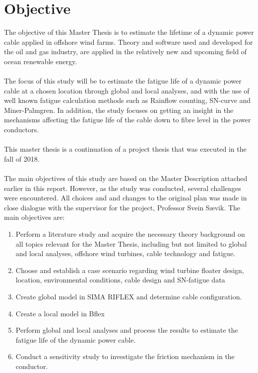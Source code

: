 \section{Objective}
The objective of this Master Thesis is to estimate the lifetime of a dynamic power cable applied in offshore wind farms. Theory and software used and developed for the oil and gas industry, are applied in the relatively new and upcoming field of ocean renewable energy.\\\\
The focus of this study will be to estimate the fatigue life of a dynamic power cable at a chosen location through global and local analyses, and with the use of well known fatigue calculation methods such as Rainflow counting, SN-curve and Miner-Palmgren.  In addition, the study focuses on getting an insight in the mechanisms affecting the fatigue life of the cable down to fibre level in the power conductors. \\\\
This master thesis is a continuation of a project thesis that was executed in the fall of 2018.\\\\
The main objectives of this study are based on the Master Description attached earlier in this report. However, as the study was conducted, several challenges were encountered. All choices and and changes to the original plan was made in close dialogue with the supervisor for the project, Professor Svein Sævik. The main objectives are:
\begin{enumerate}
    \item Perform a literature study and acquire the necessary theory background on all topics relevant for the Master Thesis, including but not limited to global and local analyses, offshore wind turbines, cable technology and fatigue.
    \item Choose and establish a case scenario regarding wind turbine floater design, location, environmental conditions, cable design and SN-fatigue data
    \item Create global model in SIMA RIFLEX and determine cable configuration. 
    \item Create a local model in Bflex
    \item Perform global and local analyses and process the results to estimate the fatigue life of the dynamic power cable.
    \item Conduct a sensitivity study to investigate the friction mechanism in the conductor.  
\end{enumerate} 

